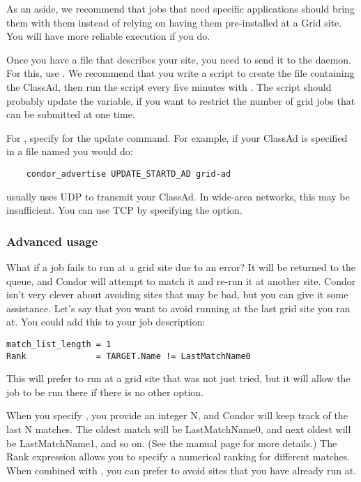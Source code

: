 As an aside, we recommend that jobs that need specific applications
should bring them with them instead of relying on having them
pre-installed at a Grid site. You will have more reliable execution if
you do. 

Once you have a file that describes your site, you need to send it to
the  daemon. For this, use .
We recommend that you write a script to create the file
containing the ClassAd, then run the script every five minutes with
. The script should probably update the 
variable, if you
want to restrict the number of grid jobs that can be submitted at one
time. 

For , specify  for
the update command. For example, if your ClassAd is specified in a
file named  you would do:

\footnotesize
\begin{verbatim}
    condor_advertise UPDATE_STARTD_AD grid-ad
\end{verbatim}
\normalsize

 usually uses UDP to transmit your ClassAd. In
wide-area networks, this may be insufficient. You can use TCP by
specifying the  option. 

\subsubsection{Advanced usage}

What if a job fails to run at a grid site due to an error? It will be
returned to the queue, and Condor will attempt to match it and
re-run it at another site. Condor isn't very clever about avoiding
sites that may be bad, but you can give it some assistance. Let's say
that you want to avoid running at the last grid site you ran at. You
could add this to your job description:

\footnotesize
\begin{verbatim}
match_list_length = 1
Rank              = TARGET.Name != LastMatchName0
\end{verbatim}
\normalsize

This will prefer to run at a grid site that was not just tried, but it
will allow the job to be run there if there is no other option. 

When you specify , you provide an integer N, and
Condor will keep track of the last N matches. The oldest match will be
LastMatchName0, and next oldest will be LastMatchName1, and so on. (See
the  manual page for more details.) The Rank expression
allows you to specify a numerical ranking for different matches. When
combined with , you can prefer to avoid sites that
you have already run at. 

